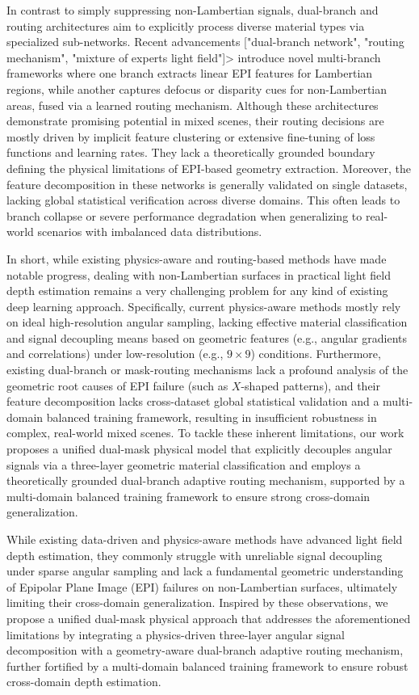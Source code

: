 \documentclass[lettersize,journal]{IEEEtran}
\begin{document}
In contrast to simply suppressing non-Lambertian signals, dual-branch and routing architectures aim to explicitly process diverse material types via specialized sub-networks. Recent advancements ["dual-branch network", "routing mechanism", "mixture of experts light field"]> introduce novel multi-branch frameworks where one branch extracts linear EPI features for Lambertian regions, while another captures defocus or disparity cues for non-Lambertian areas, fused via a learned routing mechanism. Although these architectures demonstrate promising potential in mixed scenes, their routing decisions are mostly driven by implicit feature clustering or extensive fine-tuning of loss functions and learning rates. They lack a theoretically grounded boundary defining the physical limitations of EPI-based geometry extraction. Moreover, the feature decomposition in these networks is generally validated on single datasets, lacking global statistical verification across diverse domains. This often leads to branch collapse or severe performance degradation when generalizing to real-world scenarios with imbalanced data distributions.

In short, while existing physics-aware and routing-based methods have made notable progress, dealing with non-Lambertian surfaces in practical light field depth estimation remains a very challenging problem for any kind of existing deep learning approach. Specifically, current physics-aware methods mostly rely on ideal high-resolution angular sampling, lacking effective material classification and signal decoupling means based on geometric features (e.g., angular gradients and correlations) under low-resolution (e.g., $9 \times 9$) conditions. Furthermore, existing dual-branch or mask-routing mechanisms lack a profound analysis of the geometric root causes of EPI failure (such as $X$-shaped patterns), and their feature decomposition lacks cross-dataset global statistical validation and a multi-domain balanced training framework, resulting in insufficient robustness in complex, real-world mixed scenes. To tackle these inherent limitations, our work proposes a unified dual-mask physical model that explicitly decouples angular signals via a three-layer geometric material classification and employs a theoretically grounded dual-branch adaptive routing mechanism, supported by a multi-domain balanced training framework to ensure strong cross-domain generalization.

While existing data-driven and physics-aware methods have advanced light field depth estimation, they commonly struggle with unreliable signal decoupling under sparse angular sampling and lack a fundamental geometric understanding of Epipolar Plane Image (EPI) failures on non-Lambertian surfaces, ultimately limiting their cross-domain generalization. Inspired by these observations, we propose a unified dual-mask physical approach that addresses the aforementioned limitations by integrating a physics-driven three-layer angular signal decomposition with a geometry-aware dual-branch adaptive routing mechanism, further fortified by a multi-domain balanced training framework to ensure robust cross-domain depth estimation.
\end{document}
